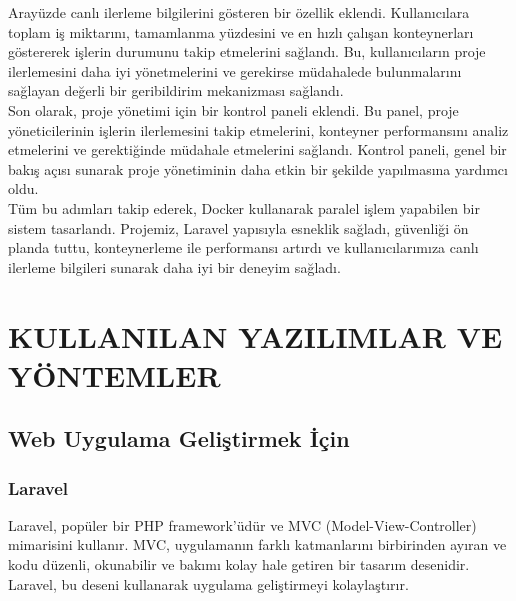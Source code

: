Arayüzde canlı ilerleme bilgilerini gösteren bir özellik eklendi. Kullanıcılara toplam iş miktarını, tamamlanma yüzdesini ve en hızlı çalışan konteynerları göstererek işlerin durumunu takip etmelerini sağlandı. Bu, kullanıcıların proje ilerlemesini daha iyi yönetmelerini ve gerekirse müdahalede bulunmalarını sağlayan değerli bir geribildirim mekanizması sağlandı.\\
Son olarak, proje yönetimi için bir kontrol paneli eklendi. Bu panel, proje yöneticilerinin işlerin ilerlemesini takip etmelerini, konteyner performansını analiz etmelerini ve gerektiğinde müdahale etmelerini sağlandı. Kontrol paneli, genel bir bakış açısı sunarak proje yönetiminin daha etkin bir şekilde yapılmasına yardımcı oldu.\\
Tüm bu adımları takip ederek, Docker kullanarak paralel işlem yapabilen bir sistem tasarlandı. Projemiz, Laravel  yapısıyla esneklik sağladı, güvenliği ön planda tuttu, konteynerleme ile performansı artırdı ve kullanıcılarımıza canlı ilerleme bilgileri sunarak daha iyi bir deneyim sağladı.\\


\section{KULLANILAN YAZILIMLAR VE YÖNTEMLER}

\subsection{Web Uygulama Geliştirmek İçin}
\subsubsection{Laravel }
Laravel, popüler bir PHP framework'üdür ve MVC (Model-View-Controller) mimarisini kullanır. MVC, uygulamanın farklı katmanlarını birbirinden ayıran ve kodu düzenli, okunabilir ve bakımı kolay hale getiren bir tasarım desenidir. Laravel, bu deseni kullanarak uygulama geliştirmeyi kolaylaştırır.

